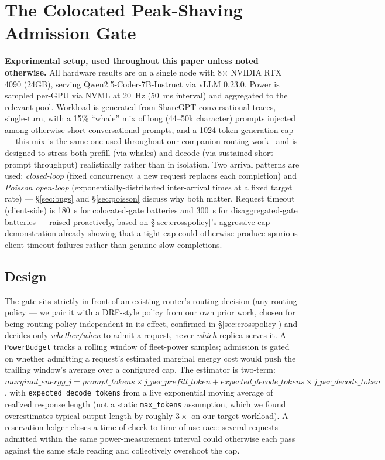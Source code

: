 \documentclass[sigconf,review,anonymous]{acmart}
\begin{document}
\section{The Colocated Peak-Shaving Admission Gate}
\label{sec:colocated}

\textbf{Experimental setup, used throughout this paper unless noted otherwise.} All hardware
results are on a single node with 8$\times$ NVIDIA RTX 4090 (24GB), serving
Qwen2.5-Coder-7B-Instruct via vLLM 0.23.0. Power is sampled per-GPU via NVML at 20~Hz (50~ms
interval) and aggregated to the relevant pool. Workload is generated from ShareGPT
conversational traces, single-turn, with a 15\% ``whale'' mix of long (44--50k character)
prompts injected among otherwise short conversational prompts, and a 1024-token generation
cap --- this mix is the same one used throughout our companion routing
work~\cite{anonymous2026routing} and is designed to stress both prefill (via whales) and
decode (via sustained short-prompt throughput) realistically rather than in isolation. Two
arrival patterns are used: \emph{closed-loop} (fixed concurrency, a new request replaces each
completion) and \emph{Poisson open-loop} (exponentially-distributed inter-arrival times at a
fixed target rate) --- \S\ref{sec:bugs} and \S\ref{sec:poisson} discuss why both matter.
Request timeout (client-side) is 180~s for colocated-gate batteries and 300~s for
disaggregated-gate batteries --- raised proactively, based on \S\ref{sec:crosspolicy}'s
aggressive-cap demonstration already showing that a tight cap could otherwise produce
spurious client-timeout failures rather than genuine slow completions.

\subsection{Design}

The gate sits strictly in front of an existing router's routing decision (any routing policy
--- we pair it with a DRF-style policy from our own prior work, chosen for being
routing-policy-independent in its effect, confirmed in \S\ref{sec:crosspolicy}) and decides
only \emph{whether/when} to admit a request, never \emph{which} replica serves it. A
\texttt{PowerBudget} tracks a rolling window of fleet-power samples; admission is gated on
whether admitting a request's estimated marginal energy cost would push the trailing window's
average over a configured cap. The estimator is two-term: $\mathit{marginal\_energy\_j} =
\mathit{prompt\_tokens} \times \mathit{j\_per\_prefill\_token} + \mathit{expected\_decode\_tokens}
\times \mathit{j\_per\_decode\_token}$, with \texttt{expected\_decode\_tokens} from a live
exponential moving average of realized response length (not a static \texttt{max\_tokens}
assumption, which we found overestimates typical output length by roughly $3\times$ on our
target workload). A reservation ledger closes a time-of-check-to-time-of-use race: several
requests admitted within the same power-measurement interval could otherwise each pass
against the same stale reading and collectively overshoot the cap.
\end{document}
